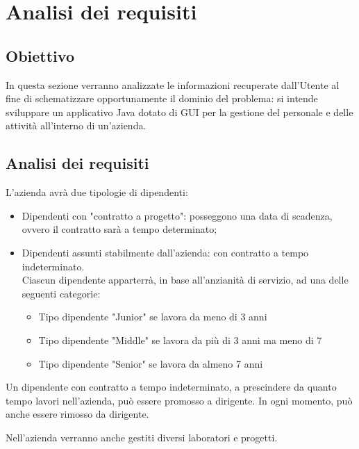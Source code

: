 \chapter{Analisi dei requisiti}
    \section{Obiettivo}
        In questa sezione verranno analizzate le informazioni recuperate dall'Utente al fine di schematizzare opportunamente il dominio del problema: si intende sviluppare un applicativo Java dotato di GUI per la gestione del personale e delle attività all'interno di un'azienda.

    \section{Analisi dei requisiti}
         L'azienda avrà due tipologie di dipendenti:
        \begin{itemize}
            \item Dipendenti con "contratto a progetto": posseggono una data di scadenza, ovvero il contratto sarà a tempo determinato;
            \item Dipendenti assunti stabilmente dall'azienda: con contratto a tempo indeterminato.\\
            Ciascun dipendente apparterrà, in base all'anzianità di servizio, ad una delle seguenti categorie:
            \begin{itemize}
                \item Tipo dipendente "Junior" se lavora da meno di 3 anni
                \item Tipo dipendente "Middle" se lavora da più di 3 anni ma meno di 7
                \item Tipo dipendente "Senior" se lavora da almeno 7 anni
            \end{itemize}
        \end{itemize}
        
        Un dipendente con contratto a tempo indeterminato, a prescindere da quanto tempo lavori nell'azienda, può essere promosso a dirigente. In ogni momento, può anche essere rimosso da dirigente.
        \vspace{1\baselineskip}
        
        \noindent Nell'azienda verranno anche gestiti diversi laboratori e progetti.
        \vspace{1\baselineskip}
        

